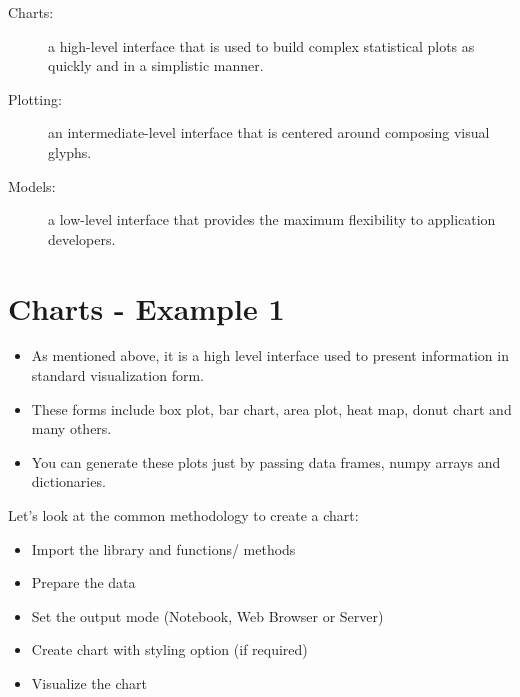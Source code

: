 \documentclass[12pt, a4paper]{report}
\begin{document}
\begin{description}
	\item[Charts:] a high-level interface that is used to build complex statistical plots as quickly and in a simplistic manner.
	\item[Plotting:] an intermediate-level interface that is centered around composing visual glyphs.
	\item[Models:] a low-level interface that provides the maximum flexibility to application developers.
\end{description}
%


\newpage

\section*{Charts - Example 1}

\begin{itemize}
\item As mentioned above, it is a high level interface used to present information in standard visualization form. 
\item These forms include box plot, bar chart, area plot, heat map, donut chart and many others.
\item You can generate these plots just by passing data frames, numpy arrays and dictionaries.
\end{itemize}


Let’s look at the common methodology to create a chart:

\begin{itemize}
	\item Import the library and functions/ methods
	\item Prepare the data
	\item Set the output mode (Notebook, Web Browser or Server)
	\item Create chart with styling option (if required)
	\item Visualize the chart
\end{itemize}

%
%
%
%
\end{document}
